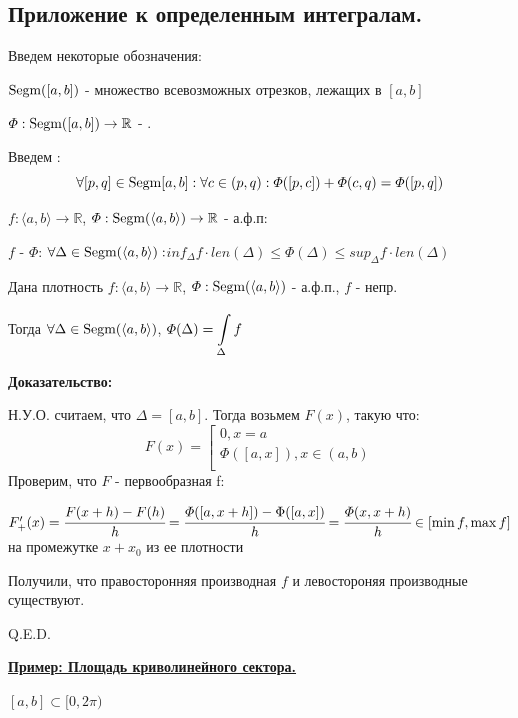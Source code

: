 \pagebreak
\subsection{Приложение к определенным интегралам.}

Введем некоторые обозначения:

$\text{Segm} ([a,b])$ - множество всевозможных отрезков, лежащих в $[a,b]$

$\varPhi: \text{Segm}([a,b]) \rightarrow \mathbb{R}$ - .

Введем :
$$\forall [p,q] \in \text{Segm}[a,b]: \forall c \in (p,q): \varPhi([p,c]) + \varPhi(c,q)= \varPhi([p,q])$$

 $f: \langle a,b \rangle \rightarrow \mathbb{R}$, $\varPhi: \text{Segm}(\langle a,b \rangle) \rightarrow \mathbb{R}$ - а.ф.п:

$f$ -  $\varPhi$: $\forall \Delta \in \text{Segm} (\langle a,b\rangle):$$inf_{\Delta} f \cdot len(\Delta)\leq \varPhi(\Delta)\leq sup_{\Delta} f \cdot len(\Delta)$


Дана плотность
$f:\langle a,b\rangle \rightarrow \mathbb{R}$, $\varPhi: \text{Segm}(\langle a,b\rangle)$ - а.ф.п., $f$ - непр.

Тогда $\forall \Delta \in \text{Segm}(\langle a,b\rangle) $, $\varPhi(\Delta) = \displaystyle\int\limits_{\Delta}^{}f$

\textbf{Доказательство:}

Н.У.О. считаем, что $\Delta = [a,b]$. Тогда возьмем $F(x)$, такую что:
$$F(x) = \left[ 
      \begin{gathered} 
        0, x=a \\ 
        \varPhi([a,x]), x \in (a,b) \\ 
      \end{gathered} 
\right.$$
Проверим, что $F$ - первообразная f:

$F'_{+}(x) = \cfrac{F(x+h)-F(h)}{h} = \cfrac{\varPhi([a, x +h])-\Phi([a,x])}{h} = \cfrac{\varPhi(x,x+h)}{h}\in [\min f, \max f]$ на промежутке $x+x_0$ из ее плотности  

Получили, что правосторонняя производная $f$ и левостороняя производные существуют.

\hfill Q.E.D.



\uline{\textbf{Пример: Площадь криволинейного сектора.} }

$[a,b] \subset [0,2\pi)$

